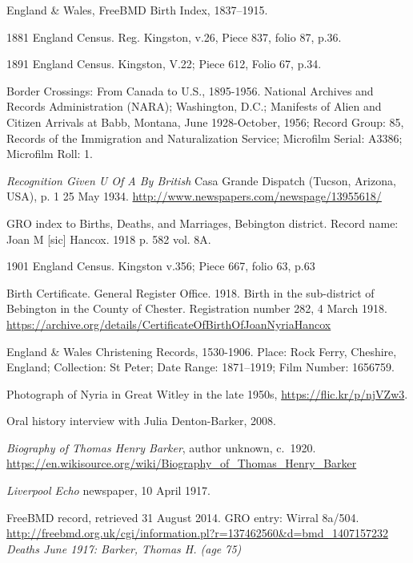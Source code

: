 \begin{thebibliography}{99}
	England \& Wales, FreeBMD Birth Index, 1837--1915.

	1881 England Census. Reg. Kingston, v.26, Piece 837, folio 87, p.36.

	1891 England Census. Kingston, V.22; Piece 612, Folio 67, p.34.

	Border Crossings: From Canada to U.S., 1895-1956.
	National Archives and Records Administration (NARA); Washington, D.C.; Manifests of Alien and Citizen Arrivals at Babb, Montana, June 1928-October, 1956; Record Group: 85, Records of the Immigration and Naturalization Service; Microfilm Serial: A3386; Microfilm Roll: 1.

	\emph{Recognition Given U Of A By British}
	Casa Grande Dispatch (Tucson, Arizona, USA), p. 1 25 May 1934. \url{http://www.newspapers.com/newspage/13955618/}

	GRO index to Births, Deaths, and Marriages,
	Bebington district. Record name: Joan M [sic] Hancox.
	1918 p. 582 vol. 8A.

	1901 England Census. Kingston v.356; Piece 667, folio 63, p.63

	Birth Certificate. General Register Office.
	1918. Birth in the sub-district of Bebington in the County of Chester.
	Registration number 282, 4 March 1918.
	\url{https://archive.org/details/CertificateOfBirthOfJoanNyriaHancox}

	England \& Wales Christening Records, 1530-1906.
	Place: Rock Ferry, Cheshire, England; Collection: St Peter;
	Date Range: 1871--1919; Film Number: 1656759.

	Photograph of Nyria in Great Witley in the late 1950s,
	\url{https://flic.kr/p/njVZw3}.

	Oral history interview with Julia Denton-Barker, 2008.

	\emph{Biography of Thomas Henry Barker}, author unknown, c.\ 1920.
	\url{https://en.wikisource.org/wiki/Biography_of_Thomas_Henry_Barker}

	\emph{Liverpool Echo} newspaper, 10 April 1917.

	FreeBMD record, retrieved 31 August 2014. GRO entry: Wirral 8a/504.
	\url{http://freebmd.org.uk/cgi/information.pl?r=137462560&d=bmd_1407157232}
	\emph{Deaths June 1917: Barker, Thomas H. (age 75)}


\end{thebibliography}
